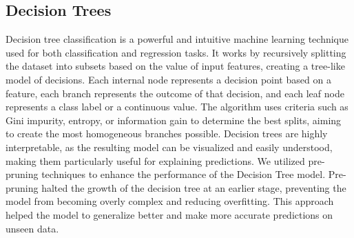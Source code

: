 \documentclass[12pt,a4paper]{article}
\begin{document}
	\subsection{Decision Trees}
	Decision tree classification is a powerful and intuitive machine learning technique used for both classification and regression tasks. It works by recursively splitting the dataset into subsets based on the value of input features, creating a tree-like model of decisions. Each internal node represents a decision point based on a feature, each branch represents the outcome of that decision, and each leaf node represents a class label or a continuous value. The algorithm uses criteria such as Gini impurity, entropy, or information gain to determine the best splits, aiming to create the most homogeneous branches possible. Decision trees are highly interpretable, as the resulting model can be visualized and easily understood, making them particularly useful for explaining predictions.
	We utilized pre-pruning techniques to enhance the performance of the Decision Tree model. Pre-pruning halted the growth of the decision tree at an earlier stage, preventing the model from becoming overly complex and reducing overfitting. This approach helped the model to generalize better and make more accurate predictions on unseen data.
\end{document}
